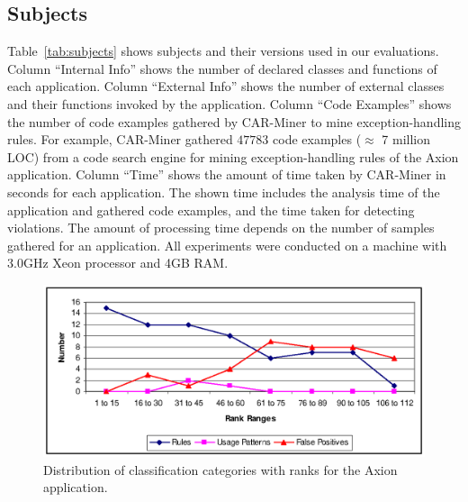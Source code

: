 \subsection{Subjects}
\label{sec:subjects}

Table~\ref{tab:subjects} shows subjects and their versions used in our evaluations.
Column ``Internal Info'' shows the number of declared classes and functions of each application.
Column ``External Info'' shows the number of external classes and their functions 
invoked by the application. Column ``Code Examples'' shows the number of code examples gathered by CAR-Miner to mine
exception-handling rules. For example, CAR-Miner gathered $47783$ code examples ($\approx$ 7 million LOC) from a code search
engine for mining exception-handling rules of the Axion application. Column ``Time'' shows the amount
of time taken by CAR-Miner in seconds for each application. The shown time includes the analysis time of the
application and gathered code examples, and the time taken for detecting violations.
The amount of processing time depends on the number of samples gathered for an
application. All experiments were conducted on a machine with 3.0GHz Xeon processor and 4GB RAM.

\begin{figure}[t]
\centering
\includegraphics[scale=0.60,clip]{charts/axion-pattern-distribution.eps}\vspace*{-3ex}
\caption{\label{chart:axion-distrib}Distribution of classification categories with ranks for the Axion application.}\vspace*{-5ex}
\end{figure}
